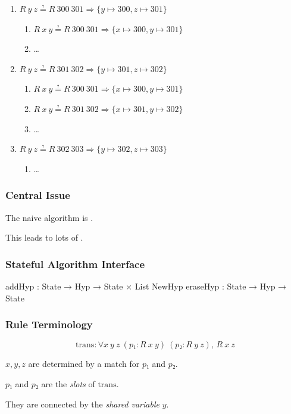 \begin{frame}
  \begin{enumerate}[<+->]
    \item $R~y~z ≟ R~300~301 ⇒ \{y ↦ 300, z ↦ 301\}$ \good
          \begin{enumerate}[<+->]
            \item $R~x~y ≟ R~300~301 ⇒ \{x ↦ 300, y ↦ 301\}$ \bad
            \item \dots
          \end{enumerate}
    \item $R~y~z ≟ R~301~302 ⇒ \{y ↦ 301, z ↦ 302\}$ \good
          \begin{enumerate}[<+->]
            \item $R~x~y ≟ R~300~301 ⇒ \{x ↦ 300, y ↦ 301\}$ 
            \item $R~x~y ≟ R~301~302 ⇒ \{x ↦ 301, y ↦ 302\}$ \bad
            \item \dots
          \end{enumerate}
    \item $R~y~z ≟ R~302~303 ⇒ \{y ↦ 302, z ↦ 303\}$ \good
          \begin{enumerate}
            \item \dots
          \end{enumerate}
  \end{enumerate}
\end{frame}

\begin{frame}
  \frametitle{Central Issue}

  The naive algorithm is .

  This leads to lots of .
\end{frame}

\begin{frame}[fragile]
  \frametitle{Stateful Algorithm Interface}

  \begin{leancode}
    addHyp   : State → Hyp → State × List NewHyp
    eraseHyp : State → Hyp → State
  \end{leancode}
\end{frame}

\begin{frame}
  \frametitle{Rule Terminology}

  \[
    \mathrm{trans} : ∀ x~y~z~(p₁ : R~x~y)~(p₂ : R~y~z),\, R~x~z
  \]

  $x, y, z$ are determined by a match for $p₁$ and $p₂$.

  $p₁$ and $p₂$ are the \emph{slots} of $\mathrm{trans}$.

  They are connected by the \emph{shared variable} $y$.
\end{frame}

